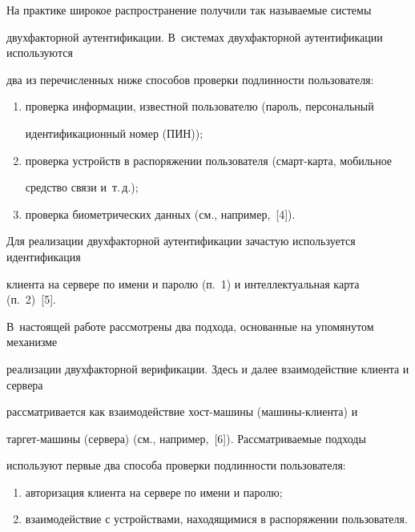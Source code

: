     


    На практике широкое распространение получили так называемые системы 


двухфакторной аутентификации. В~системах двухфакторной аутентификации используются 


два из перечисленных ниже способов проверки подлинности пользователя:


    \begin{enumerate}[(1)]


\item проверка информации, известной пользователю (пароль, персональный 


идентификационный номер (ПИН));\\[-14pt]


\item проверка устройств в распоряжении пользователя (смарт-кар\-та, мобильное 


средство связи и~т.\,д.);\\[-14pt]


\item проверка биометрических данных (см., например,~[4]).


\end{enumerate}





    Для реализации двухфакторной аутентификации зачастую используется идентификация 


клиента на сервере по имени и паролю (п.~1) и интеллектуальная карта (п.~2)~[5]. 


В~настоящей работе рассмотрены два подхода, основанные на упомянутом механизме 


реализации двухфакторной верификации. Здесь и далее взаимодействие клиента и сервера 


рассматривается как взаимодействие хост-ма\-ши\-ны (ма\-ши\-ны-кли\-ен\-та) и 


    тар\-гет-ма\-ши\-ны (сервера) (см., например,~[6]). Рассматриваемые подходы 


используют первые два способа проверки подлин\-ности пользователя:


    \begin{enumerate}[(1)]


\item авторизация клиента на сервере по имени и паролю;\\[-14pt]


\item взаимодействие с устройствами, находящимися в распоряжении пользователя.


\end{enumerate}





